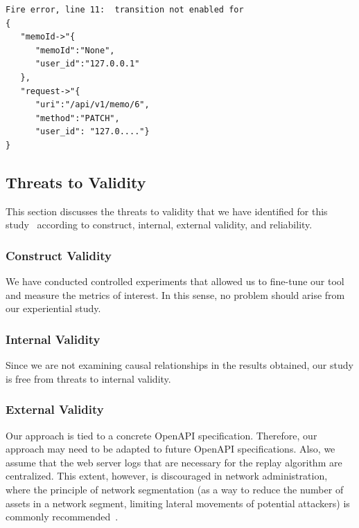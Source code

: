 \begin{lstlisting}[caption={Error message displayed when verifying with the CPN obtained after the transformation the log file containing the BOLA attack carried out.},captionpos=t,basicstyle=\ttfamily\small, label={lst:memos_error_msg},frame=single,breaklines=true]
Fire error, line 11:  transition not enabled for 
{
   "memoId->"{
      "memoId":"None",
      "user_id":"127.0.0.1"
   },
   "request->"{
      "uri":"/api/v1/memo/6",
      "method":"PATCH",
      "user_id": "127.0...."}
}
\end{lstlisting}


\subsection{Threats to Validity}

This section discusses the threats to validity that we have identified for this study~\cite{RH-ESE-09} according to construct, internal, external validity, and reliability.

\subsubsection*{Construct Validity}

We have conducted controlled experiments that allowed us to fine-tune our tool and measure the metrics of interest. In this sense, no problem should arise from our experiential study. 

\subsubsection*{Internal Validity}

Since we are not examining causal relationships in the results obtained, our study is free from threats to internal validity.

\subsubsection*{External Validity}

Our approach is tied to a concrete OpenAPI specification. Therefore, our approach may need to be adapted to future OpenAPI specifications. Also, we assume that the web server logs that are necessary for the replay algorithm are centralized. This extent, however, is discouraged in network administration, where the principle of network segmentation (as a way to reduce the number of assets in a network segment, limiting lateral movements of potential attackers) is commonly recommended~\cite{NetSegmentation-book-19}.

